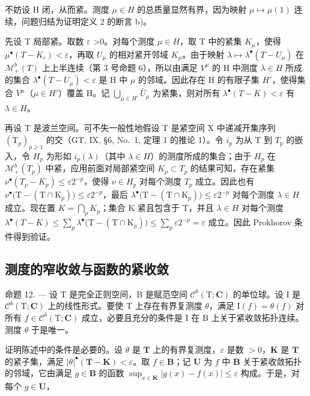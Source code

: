 不妨设 H 闭，从而紧。测度 \(\mu \in H\) 的总质量显然有界，因为映射 \(\mu \mapsto \mu(1)\) 连续，问题归结为证明定义 2 的断言 b)。

先设 T 局部紧。取数 \(\varepsilon\) \textgreater0。对每个测度 \(\mu\in H\)，取 T 中的紧集 \(K_{\mu}\)，使得 \(\mu^{\bullet}(T-K_{\varepsilon})<\varepsilon\)，再取 \(U_{\mu}\) 的相对紧开邻域 \(K_{\mu}\)。由于映射 \(\lambda\mapsto\lambda^{\bullet}(T-U_{\mu})\) 在 \(\mathcal{M}_{+}^{b}(T)\) 上上半连续（第 3 号命题 6），所以由满足 \(V^{\mu}\) 的 H 中测度 \(\lambda\in H\) 所成的集合 \(\lambda^{\bullet}(T-U_{\mu})<\varepsilon\) 是 H 中 \(\mu\) 的邻域。因此存在 H 的有限子集 \(H'\)，使得集合 \(V^{\mu}\)（\(\mu\in H'\)）覆盖 H。记 \(\bigcup_{\mu\in H'}\overline{U}_{\mu}\) 为紧集，则对所有 \(\lambda^{\bullet}(T-K)<\varepsilon\) 有 \(\lambda\in H\)。

再设 T 是波兰空间。可不失一般性地假设 T 是紧空间 X 中递减开集序列 \((\mathrm{T}_{p})_{p\geqslant1}\) 的交（GT, IX, §6, No.~1, 定理 1 的推论 1）。令 \(i_{p}\) 为从 T 到 \(T_{p}\) 的嵌入，令 \(H_{p}\) 为形如 \(i_{p}(\lambda)\)（其中 \(\lambda\in H\)）的测度所成的集合；由于 \(H_{p}\) 在 \(\mathcal{M}_{+}^{b}(T_{p})\) 中紧，应用前面对局部紧空间 \(K_{p}\subset T_{p}\) 的结果可知，存在紧集 \(\nu^{\bullet}(T_{p}-K_{p})\leqslant\varepsilon2^{-p}\)，使得 \(\nu\in H_{p}\) 对每个测度 \(T_{p}\) 成立。因此也有 \(\nu^{\bullet}\big(\mathrm{T}-(\mathrm{T}\cap\mathrm{K}_{p})\big)\leqslant\varepsilon2^{-p}\)，最后 \(\lambda^{\bullet}\big(\mathrm{T}-(\mathrm{T}\cap\mathrm{K}_{p})\big)\leqslant\varepsilon2^{-p}\) 对每个测度 \(\lambda\in H\) 成立。现在置 \(K=\bigcap_{p}K_{p}\)；集合 K 紧且包含于 T，并且 \(\lambda\in H\) 对每个测度 \(\lambda^{\bullet}(T-K)\leqslant\sum_{p}\lambda^{\bullet}\big(\mathrm{T}-(\mathrm{T}\cap\mathrm{K}_{p})\big)\leqslant\sum_{p}\varepsilon2^{-p}=\varepsilon\) 成立。因此 Prokhorov 条件得到验证。

\subsection{测度的窄收敛与函数的紧收敛}

命题 12. --- 设 T 是完全正则空间，B 是赋范空间 \(\mathcal{C}^{b}(\mathrm{T};\mathbf{C})\) 的单位球。设 I 是 \(\mathcal{C}^{b}(\mathrm{T};\mathbf{C})\) 上的线性形式。要使 T 上存在有界复测度 \(\theta\)，满足 \(\mathrm{I}(f)=\theta(f)\) 对所有 \(f\in\mathcal{C}^{b}(\mathrm{T};\mathbf{C})\) 成立，必要且充分的条件是 I 在 B 上关于紧收敛拓扑连续。测度 \(\theta\) 于是唯一。

证明陈述中的条件是必要的。设 \(\theta\) 是 \(\mathbf{T}\) 上的有界复测度，\(\varepsilon\) 是数 \(>0\)，\(\mathbf{K}\) 是 \(\mathbf{T}\) 的紧子集，满足 \(|\theta|^{\bullet}(\mathbf{T} - \mathbf{K}) < \varepsilon\)。取 \(f \in \mathbf{B}\)；记 \(\mathbf{U}\) 为 \(f\) 中 \(\mathbf{B}\) 关于紧收敛拓扑的邻域，它由满足 \(g \in \mathbf{B}\) 的函数 \(\sup_{x \in \mathbf{K}} |g(x) - f(x)| \leqslant \varepsilon\) 构成。于是，对每个 \(g \in \mathbf{U}\)，

